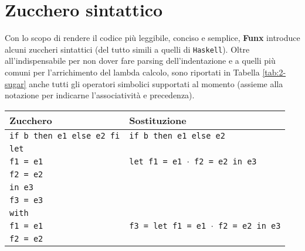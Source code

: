\section{Zucchero sintattico}
\label{sec:2-syntactic-sugar}

Con lo scopo di rendere il codice più leggibile, conciso e semplice, \textbf{Funx} introduce
alcuni zuccheri sintattici (del tutto simili a quelli di \texttt{Haskell}).
Oltre all'indispensabile per non dover fare parsing dell'indentazione
e a quelli più comuni per l'arrichimento del lambda calcolo, sono riportati in Tabella \ref{tab:2-sugar}
anche tutti gli operatori simbolici supportati al momento (assieme alla notazione per indicarne l'associatività e precedenza).

\newpage

\begin{table}[H]
    \begin{center}
        \renewcommand{\arraystretch}{1.3}
        \begin{tabularx}{\textwidth}{|p{16em}|X|}
            \hline
            \textbf{Zucchero}                & \textbf{Sostituzione}                                            \\
            \hline
            \texttt{if b then e1 else e2 fi} & \texttt{if b then e1 else e2}                                    \\
            \hline
            \texttt{let}                     &                                                                  \\
            \texttt{f1 = e1}                 & \texttt{let f1 = e1 $\cdot$ f2 = e2 in e3}                       \\
            \texttt{f2 = e2}                 &                                                                  \\
            \texttt{in e3}                   &                                                                  \\
            \hline
            \texttt{f3 = e3}                 &                                                                  \\
            \texttt{with}                    &                                                                  \\
            \texttt{f1 = e1}                 & \texttt{f3 = let f1 = e1 $\cdot$ f2 = e2 in e3}                  \\
            \texttt{f2 = e2}                 &                                                                  \\

\end{tabularx}
\end{center}
\end{table}
